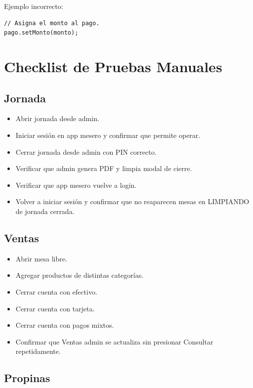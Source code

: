 \documentclass[11pt,letterpaper,openany]{report}
\begin{document}
Ejemplo incorrecto:

\begin{lstlisting}
// Asigna el monto al pago.
pago.setMonto(monto);
\end{lstlisting}

\chapter{Checklist de Pruebas Manuales}

\section{Jornada}

\begin{itemize}[leftmargin=*]
  \item Abrir jornada desde admin.
  \item Iniciar sesión en app mesero y confirmar que permite operar.
  \item Cerrar jornada desde admin con PIN correcto.
  \item Verificar que admin genera PDF y limpia modal de cierre.
  \item Verificar que app mesero vuelve a login.
  \item Volver a iniciar sesión y confirmar que no reaparecen mesas en LIMPIANDO de jornada cerrada.
\end{itemize}

\section{Ventas}

\begin{itemize}[leftmargin=*]
  \item Abrir mesa libre.
  \item Agregar productos de distintas categorías.
  \item Cerrar cuenta con efectivo.
  \item Cerrar cuenta con tarjeta.
  \item Cerrar cuenta con pagos mixtos.
  \item Confirmar que Ventas admin se actualiza sin presionar Consultar repetidamente.
\end{itemize}

\section{Propinas}
\end{document}
